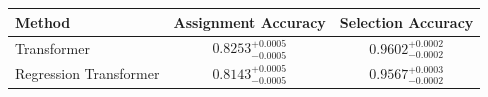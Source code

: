     \begin{tabular}{lcc}
        \toprule
        Method & Assignment Accuracy & Selection Accuracy \\
        \midrule
        Transformer & $0.8253_{-0.0005}^{+0.0005}$ & $0.9602_{-0.0002}^{+0.0002}$ \\
        Regression Transformer & $0.8143_{-0.0005}^{+0.0005}$ & $0.9567_{-0.0002}^{+0.0003}$ \\
        \bottomrule
    \end{tabular}